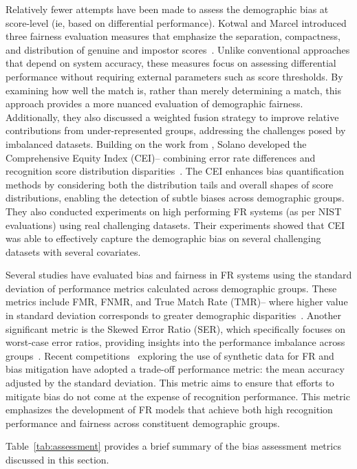Relatively fewer attempts have been made to assess the demographic bias at
score-level (ie, based on differential performance).  Kotwal and Marcel
introduced three fairness evaluation measures that emphasize the separation,
compactness, and distribution of genuine and impostor
scores~\cite{kotwal2022fairness}. Unlike conventional approaches that depend on
system accuracy, these measures focus on assessing differential performance
without requiring external parameters such as score thresholds. By examining how
well the match is, rather than merely determining a match, this approach
provides a more nuanced evaluation of demographic fairness. Additionally, they
also discussed a weighted fusion strategy to improve relative contributions from
under-represented groups, addressing the challenges posed by imbalanced
datasets.
%
Building on the work from \cite{kotwal2022fairness}, Solano \etal developed the
Comprehensive Equity Index (CEI)-- combining error rate differences and
recognition score distribution disparities~\cite{solano2024comprehensive}.  The
CEI enhances bias quantification methods by considering both the distribution
tails and overall shapes of score distributions, enabling the detection of
subtle biases across demographic groups. They also conducted experiments on high
performing FR systems (as per NIST evaluations) using real challenging datasets.
Their experiments showed that CEI was able to effectively capture the
demographic bias on several challenging datasets with several covariates.

Several studies have evaluated bias and fairness in FR systems using the
standard deviation of performance metrics calculated across demographic groups.
These metrics include FMR, FNMR, and True Match Rate (TMR)-- where higher value
in standard deviation corresponds to greater demographic
disparities~\cite{terhorst2021comprehensive, gong2020jointly,
lu2019experimental, robinson2020face, wang2020mitigating, villalobos2022fair}.
Another significant metric is the Skewed Error Ratio (SER), which specifically
focuses on worst-case error ratios, providing insights into the performance
imbalance across groups~\cite{villalobos2022fair, wang2020mitigating,
kotwal2024WACV}. Recent competitions~\cite{melzi2024frcsyn, melzi2024frcsyn1,
deandres2024frcsyn} exploring the use of synthetic data for FR and bias
mitigation have adopted a trade-off performance metric: the mean accuracy
adjusted by the standard deviation. This metric aims to ensure that efforts to
mitigate bias do not come at the expense of recognition performance. This
metric emphasizes the development of FR models that achieve both high
recognition performance and fairness across constituent demographic groups.

Table~\ref{tab:assessment} provides a brief summary of the bias assessment
metrics discussed in this section.

